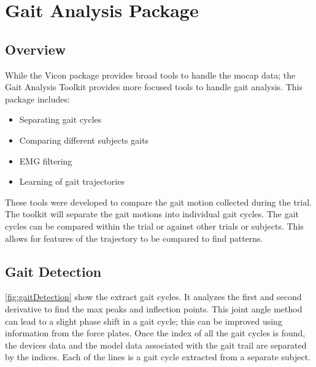 \section{Gait Analysis Package}

\subsection{Overview}
While the Vicon package provides broad tools to handle the mocap data; the Gait Analysis Toolkit provides more focused tools to handle gait analysis. This package includes: 
\begin{itemize}[noitemsep]
    \item Separating gait cycles
    \item Comparing different subjects gaits
    \item EMG filtering
    \item Learning of gait trajectories
\end{itemize}

These tools were developed to compare the gait motion collected during the trial. The toolkit will separate the gait motions into individual gait cycles. The gait cycles can be compared within the trial or against other trials or subjects. This allows for features of the trajectory to be compared to find patterns. 

\subsection{Gait Detection}
\autoref{fig:gaitDetection} show the extract gait cycles. It analyzes the first and second derivative to find the max peaks and inflection points. This joint angle method can lead to a slight phase shift in a gait cycle; this can be improved using information from the force plates. Once the index of all the gait cycles is found, the devices data and the model data associated with the gait trail are separated by the indices. Each of the lines is a gait cycle extracted from a separate subject. 

